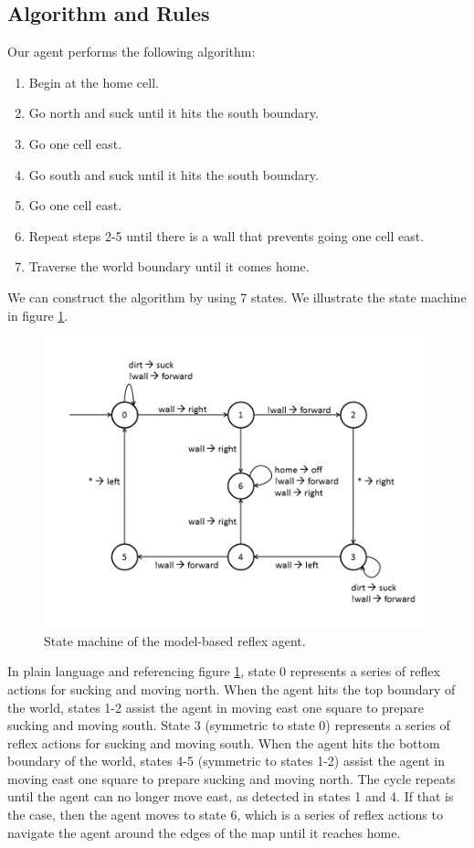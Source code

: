 \subsection{Algorithm and Rules}

Our agent performs the following algorithm: 

\begin{enumerate}
	\item Begin at the home cell.
	\item Go north and suck until it hits the south boundary. 
	\item Go one cell east.
	\item Go south and suck until it hits the south boundary.
	\item Go one cell east.
	\item Repeat steps 2-5 until there is a wall that prevents going one cell east.
	\item Traverse the world boundary until it comes home.
\end{enumerate}

We can construct the algorithm by using 7 states. We illustrate the state machine in figure \ref{fig:states}.

\begin{figure}[!t]
	\centering
	\includegraphics[scale=.30]{img/3-statediag.png}
	\caption{State machine of the model-based reflex agent.}
	\label{fig:states}
\end{figure}

In plain language and referencing figure \ref{fig:states}, state 0 represents a series of reflex actions for sucking and moving north. When the agent hits the top boundary of the world, states 1-2 assist the agent in moving east one square to prepare sucking and moving south. State 3 (symmetric to state 0) represents a series of reflex actions for sucking and moving south. When the agent hits the bottom boundary of the world, states 4-5 (symmetric to states 1-2) assist the agent in moving east one square to prepare sucking and moving north. The cycle repeats until the agent can no longer move east, as detected in states 1 and 4. If that is the case, then the agent moves to state 6, which is a series of reflex actions to navigate the agent around the edges of the map until it reaches home.

